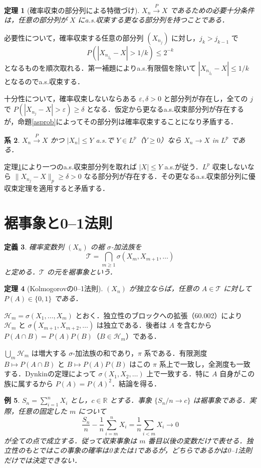 \documentclass[a5paper,10pt,onecolumn]{jsarticle}
\makeatletter
\theoremstyle{mathnotetheorem}
\newtheorem{theorem}{定理}[section]
\newtheorem{definition}[theorem]{定義}
\newtheorem{corollary}[theorem]{系}
\newtheorem{example}[theorem]{例}
\renewcommand{\proofname}{証明}
\renewenvironment{proof}[1][\proofname]{%
  \par\pushQED{\qed}\normalfont\topsep4\p@\@plus2\p@\relax
  \trivlist\item[\hskip\labelsep\bfseries #1]\ignorespaces
}{\popQED\endtrivlist\@endpefalse}
\newcommand{\R}{\mathbb{R}}
\newcommand{\norm}[1]{\lVert #1\rVert}
\newcommand{\1}{\mathbf{1}}
\makeatother
\begin{document}
\begin{theorem}[確率収束の部分列による特徴づけ]\label{subseq}
$X_n\xrightarrow{P}X$ であるための必要十分条件は，任意の部分列が $X$ にa.s.収束する更なる部分列を持つことである．
\end{theorem}
\begin{proof}
必要性について，確率収束する任意の部分列 $(X_{n_j})$ に対し，$j_k>j_{k-1}$ で
\[
 P(|X_{n_{j_k}}-X|>1/k)\le 2^{-k}
\]
となるものを順次取れる．第一補題によりa.s.有限個を除いて $|X_{n_{j_k}}-X|\le1/k$ となるのでa.s.収束する．

十分性について，確率収束しないならある $\varepsilon,\delta>0$ と部分列が存在し，全ての $j$ で $P(|X_{n_j}-X|>\varepsilon)\ge\delta$ となる．仮定から更なるa.s.収束部分列が存在するが，命題\ref{asprob}によってその部分列は確率収束することになり矛盾する．
\end{proof}
\begin{corollary}
$X_n\xrightarrow{P}X$ かつ $|X_n|\le Y$ a.s.で $Y\in L^p$（$Y\ge0$）なら $X_n\to X$ in $L^p$ である．
\end{corollary}
\begin{proof}
定理\ref{subseq}により一つのa.s.収束部分列を取れば $|X|\le Y$ a.s.が従う．$L^p$ 収束しないなら $\norm{X_{n_j}-X}_p\ge\delta>0$ なる部分列が存在する．その更なるa.s.収束部分列に優収束定理を適用すると矛盾する．
\end{proof}

\section{裾事象と0--1法則}
\begin{definition}
確率変数列 $(X_n)$ の裾 $\sigma$-加法族を
\[
 \mathcal T=\bigcap_{m\ge1}\sigma(X_m,X_{m+1},\ldots)
\]
と定める．$\mathcal T$ の元を裾事象という．
\end{definition}
\begin{theorem}[Kolmogorovの0--1法則]\label{zeroone}
$(X_n)$ が独立ならば，任意の $A\in\mathcal T$ に対して $P(A)\in\{0,1\}$ である．
\end{theorem}
\begin{proof}
$\mathcal H_m=\sigma(X_1,\ldots,X_m)$ とおく．独立性のブロックへの拡張（60.002）により $\mathcal H_m$ と $\sigma(X_{m+1},X_{m+2},\ldots)$ は独立である．後者は $A$ を含むから $P(A\cap B)=P(A)P(B)$（$B\in\mathcal H_m$）である．

$\bigcup_m\mathcal H_m$ は増大する $\sigma$-加法族の和であり，$\pi$ 系である．有限測度 $B\mapsto P(A\cap B)$ と $B\mapsto P(A)P(B)$ はこの $\pi$ 系上で一致し，全測度も一致する．Dynkinの定理によって $\sigma(X_1,X_2,\ldots)$ 上で一致する．特に $A$ 自身がこの族に属するから $P(A)=P(A)^2$．結論を得る．
\end{proof}
\begin{example}
$S_n=\sum_{i=1}^nX_i$ とし，$c\in\R$ とする．事象 $\{S_n/n\to c\}$ は裾事象である．実際，任意の固定した $m$ について
\[
 \frac{S_n}{n}-\frac1n\sum_{i=m}^n X_i
 =\frac1n\sum_{i<m}X_i\longrightarrow0
\]
が全ての点で成立する．従って収束事象は $m$ 番目以後の変数だけで表せる．独立性のもとではこの事象の確率は0または1であるが，どちらであるかは0--1法則だけでは決定できない．
\end{example}
\end{document}
